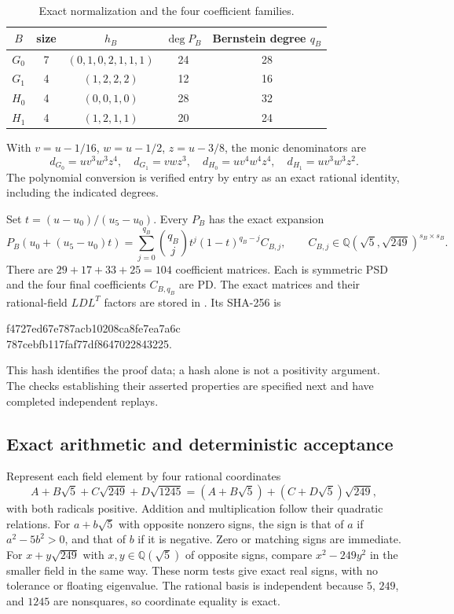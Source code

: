 \documentclass[11pt]{article}
\newcommand{\Q}{\mathbb Q}
\begin{document}
\begin{table}[ht]
\centering\small
\begin{tabular}{c c c c c}
\toprule
$B$ & size & $h_B$ & $\deg P_B$ & Bernstein degree $q_B$\\\midrule
$G_0$ &7&$(0,1,0,2,1,1,1)$&24&28\\
$G_1$ &4&$(1,2,2,2)$&12&16\\
$H_0$ &4&$(0,0,1,0)$&28&32\\
$H_1$ &4&$(1,2,1,1)$&20&24\\\bottomrule
\end{tabular}
\caption{Exact normalization and the four coefficient families.}\label{tab:normalization}
\end{table}
With $v=u-1/16$, $w=u-1/2$, $z=u-3/8$, the monic denominators are
\[
 d_{G_0}=uv^3w^3z^4,\quad d_{G_1}=vwz^3,\quad
 d_{H_0}=uv^4w^4z^4,\quad d_{H_1}=uv^3w^3z^2.
\]
The polynomial conversion is verified entry by entry as an exact
rational identity, including the indicated degrees.

Set $t=(u-u_0)/(u_5-u_0)$. Every $P_B$ has the exact expansion
\begin{equation}\label{eq:bernstein}
 P_B(u_0+(u_5-u_0)t)=
 \sum_{j=0}^{q_B}\binom{q_B}{j}t^j(1-t)^{q_B-j}C_{B,j},
 \qquad C_{B,j}\in\Q(\sqrt5,\sqrt{249})^{s_B\times s_B}.
\end{equation}
There are $29+17+33+25=104$ coefficient matrices. Each is symmetric
PSD and the four final coefficients $C_{B,q_B}$ are PD. The exact
matrices and their rational-field $LDL^T$ factors are stored in
. Its SHA-256 is
\begin{center}\footnotesize\ttfamily
 f4727ed67e787acb10208ca8fe7ea7a6c\\
 787cebfb117faf77df8647022843225.
\end{center}
This hash identifies the proof data; a hash alone is not a positivity
argument. The checks establishing their asserted properties are specified
next and have completed independent replays.

\subsection{Exact arithmetic and deterministic acceptance}
Represent each field element by four rational coordinates
\[
 A+B\sqrt5+C\sqrt{249}+D\sqrt{1245}
 =(A+B\sqrt5)+(C+D\sqrt5)\sqrt{249},
\]
with both radicals positive. Addition and multiplication follow their
quadratic relations. For $a+b\sqrt5$ with opposite nonzero signs,
the sign is that of $a$ if $a^2-5b^2>0$, and that of $b$ if it is
negative. Zero or matching signs are immediate. For
$x+y\sqrt{249}$ with $x,y\in\Q(\sqrt5)$ of opposite signs, compare
$x^2-249y^2$ in the smaller field in the same way. These norm tests
give exact real signs, with no tolerance or floating eigenvalue.
The rational basis is independent because $5$, $249$, and $1245$
are nonsquares, so coordinate equality is exact.
\end{document}
